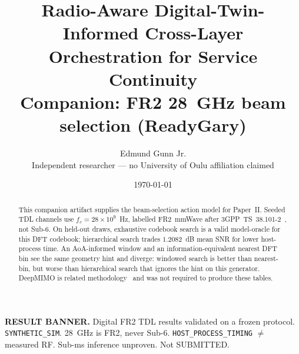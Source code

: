 \documentclass[11pt]{article}
\title{Radio-Aware Digital-Twin-Informed Cross-Layer Orchestration for Service Continuity\\{\large Companion: FR2 28~GHz beam selection (ReadyGary)}}
\author{Edmund Gunn Jr.\\Independent researcher --- no University of Oulu affiliation claimed}
\date{\today}
\begin{document}
\maketitle
\begin{center}
\textbf{RESULT BANNER.} Digital FR2 TDL results validated on a frozen protocol.
\texttt{SYNTHETIC\_SIM}. 28~GHz is FR2, never Sub-6.
\texttt{HOST\_PROCESS\_TIMING} $\neq$ measured RF. Sub-ms inference unproven.
Not SUBMITTED.
\end{center}
\begin{abstract}
This companion artifact supplies the beam-selection action model for Paper~II.
Seeded TDL channels use $f_c=28\times10^9$~Hz, labelled FR2~mmWave after 3GPP~TS~38.101-2~\cite{3gpp_ts38101_2}, not Sub-6.
On held-out draws, exhaustive codebook search is a valid model-oracle for this DFT codebook; hierarchical search trades $1.2082$~dB mean SNR for lower host-process time.
An AoA-informed window and an information-equivalent nearest DFT bin see the same geometry hint and diverge: windowed search is better than nearest-bin, but worse than hierarchical search that ignores the hint on this generator.
DeepMIMO is related methodology~\cite{alkhateeb2019deepmimo} and was not required to produce these tables.
\end{abstract}






\end{document}
